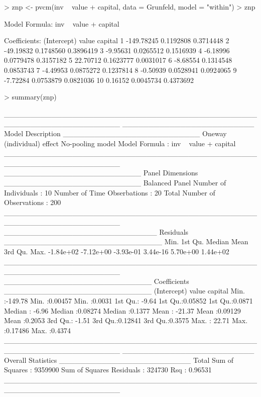 \documentclass{article}
\begin{document}
\begin{Schunk}
\begin{Sinput}
> znp <- pvcm(inv ~ value + capital, data = Grunfeld, model = "within")
> znp
\end{Sinput}
\begin{Soutput}
Model Formula: inv ~ value + capital

Coefficients:
   (Intercept)     value   capital
1   -149.78245 0.1192808 0.3714448
2    -49.19832 0.1748560 0.3896419
3     -9.95631 0.0265512 0.1516939
4     -6.18996 0.0779478 0.3157182
5     22.70712 0.1623777 0.0031017
6     -8.68554 0.1314548 0.0853743
7     -4.49953 0.0875272 0.1237814
8     -0.50939 0.0528941 0.0924065
9     -7.72284 0.0753879 0.0821036
10     0.16152 0.0045734 0.4373692
\end{Soutput}
\begin{Sinput}
> summary(znp)
\end{Sinput}
\begin{Soutput}
______________________________________________________________________ 
_________________________ Model Description __________________________
Oneway (individual) effect
No-pooling model
Model Formula             : inv ~ value + capital
______________________________________________________________________ 
__________________________ Panel Dimensions __________________________
Balanced Panel
Number of Individuals        :  10
Number of Time Obserbations  :  20
Total Number of Observations :  200
______________________________________________________________________ 
_____________________________ Residuals ______________________________
     Min.   1st Qu.    Median      Mean   3rd Qu.      Max. 
-1.84e+02 -7.12e+00 -3.93e-01  3.44e-16  5.70e+00  1.44e+02 
______________________________________________________________________ 
____________________________ Coefficients ____________________________
  (Intercept)          value            capital      
 Min.   :-149.78   Min.   :0.00457   Min.   :0.0031  
 1st Qu.:  -9.64   1st Qu.:0.05852   1st Qu.:0.0871  
 Median :  -6.96   Median :0.08274   Median :0.1377  
 Mean   : -21.37   Mean   :0.09129   Mean   :0.2053  
 3rd Qu.:  -1.51   3rd Qu.:0.12841   3rd Qu.:0.3575  
 Max.   :  22.71   Max.   :0.17486   Max.   :0.4374  
______________________________________________________________________ 
_________________________ Overall Statistics _________________________
Total Sum of Squares       : 9359900
Sum of Squares Residuals   : 324730
Rsq                        : 0.96531
______________________________________________________________________ 
\end{Soutput}
\end{Schunk}
\end{document}
